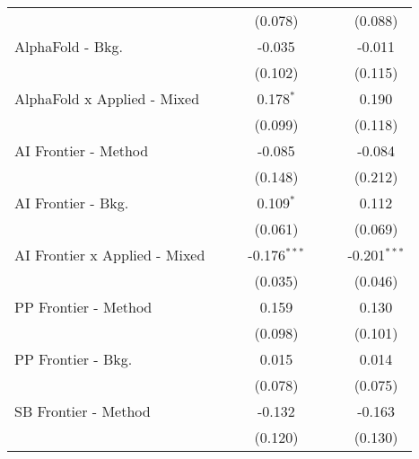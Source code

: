 \begin{tabular}{lcccccc}
                                  &         &             & (0.078)        &              &         & (0.088)\\   
   AlphaFold - Bkg.               &         &             & -0.035         &              &         & -0.011\\   
                                  &         &             & (0.102)        &              &         & (0.115)\\   
   AlphaFold x Applied - Mixed    &         &             & 0.178$^{*}$    &              &         & 0.190\\   
                                  &         &             & (0.099)        &              &         & (0.118)\\   
   AI Frontier - Method           &         &             & -0.085         &              &         & -0.084\\   
                                  &         &             & (0.148)        &              &         & (0.212)\\   
   AI Frontier - Bkg.             &         &             & 0.109$^{*}$    &              &         & 0.112\\   
                                  &         &             & (0.061)        &              &         & (0.069)\\   
   AI Frontier x Applied - Mixed  &         &             & -0.176$^{***}$ &              &         & -0.201$^{***}$\\   
                                  &         &             & (0.035)        &              &         & (0.046)\\   
   PP Frontier - Method           &         &             & 0.159          &              &         & 0.130\\   
                                  &         &             & (0.098)        &              &         & (0.101)\\   
   PP Frontier - Bkg.             &         &             & 0.015          &              &         & 0.014\\   
                                  &         &             & (0.078)        &              &         & (0.075)\\   
   SB Frontier - Method           &         &             & -0.132         &              &         & -0.163\\   
                                  &         &             & (0.120)        &              &         & (0.130)\\   

\end{tabular}
